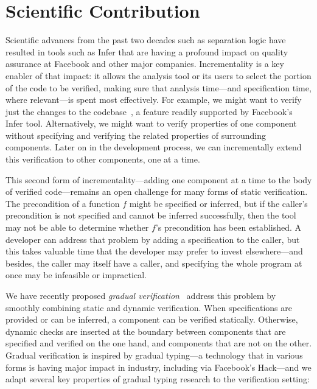 \documentclass[10pt,twocolumn]{article}
\begin{document}
\begin{sloppypar}


\section{Scientific Contribution}

Scientific advances from the past two decades such as separation logic have resulted in tools such as Infer that are having a profound impact on quality assurance at Facebook and other major companies.  Incrementality is a key enabler of that impact: it allows the analysis tool or its users to select the portion of the code to be verified, making sure that analysis time---and specification time, where relevant---is spent most effectively.  For example, we might want to verify just the changes to the codebase~\cite{StartupsScaleups}, a feature readily supported by Facebook's Infer tool.  Alternatively, we might want to verify properties of one component without specifying and verifying the related properties of surrounding components.  Later on in the development process, we can incrementally extend this verification to other components, one at a time.

This second form of incrementality---adding one component at a time to the body of verified code---remains an open challenge for many forms of static verification. The precondition of a function $f$ might be specified or inferred, but if the caller's precondition is not specified and cannot be inferred successfully, then the tool may not be able to determine whether $f$'s precondition has been established. A developer can address that problem by adding a specification to the caller, but this takes valuable time that the developer may prefer to invest elsewhere---and besides, the caller may itself have a caller, and specifying the whole program at once may be infeasible or impractical.

We have recently proposed \textit{gradual verification}~\cite{baderAl:vmcai2018} address this problem by smoothly combining static and dynamic verification. When specifications are provided or can be inferred, a component can be verified statically.  Otherwise, dynamic checks are inserted at the boundary between components that are specified and verified on the one hand, and components that are not on the other. Gradual verification is inspired by gradual typing---a technology that in various forms is having major impact in industry, including via Facebook's Hack---and we adapt several key properties of gradual typing research to the verification setting:


\end{sloppypar}
\end{document}
